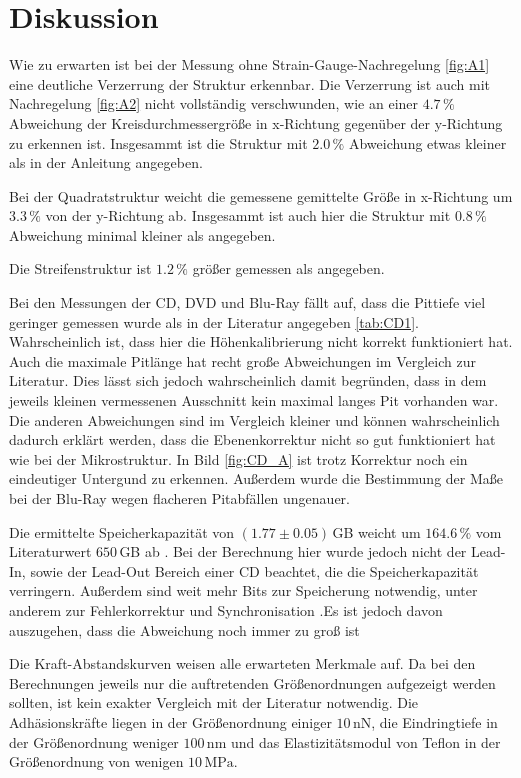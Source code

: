 \newpage
\section{Diskussion}
\label{sec:conclusion}

Wie zu erwarten ist bei der Messung ohne Strain-Gauge-Nachregelung \ref{fig:A1}
eine deutliche Verzerrung der Struktur erkennbar.
Die Verzerrung ist auch mit Nachregelung \ref{fig:A2} nicht vollständig verschwunden,
wie an einer $4.7\,\si{\percent}$ Abweichung der Kreisdurchmessergröße in x-Richtung gegenüber der y-Richtung zu erkennen ist.
Insgesammt ist die Struktur mit $2.0\,\si{\percent}$ Abweichung etwas kleiner als in der Anleitung angegeben.

Bei der Quadratstruktur weicht die gemessene gemittelte Größe in x-Richtung um $3.3\,\si{\percent}$ von der y-Richtung ab.
Insgesammt ist auch hier die Struktur mit $0.8\,\si{\percent}$ Abweichung minimal kleiner als angegeben.

Die Streifenstruktur ist $1.2\,\si{\percent}$ größer gemessen als angegeben.


Bei den Messungen der CD, DVD und Blu-Ray fällt auf, dass die Pittiefe viel geringer gemessen wurde 
als in der Literatur angegeben \ref{tab:CD1}. Wahrscheinlich ist, dass hier die Höhenkalibrierung nicht korrekt funktioniert hat.
Auch die maximale Pitlänge hat recht große Abweichungen im Vergleich zur Literatur. Dies lässt sich jedoch wahrscheinlich damit begründen,
dass in dem jeweils kleinen vermessenen Ausschnitt kein maximal langes Pit vorhanden war.
Die anderen Abweichungen sind im Vergleich kleiner und können wahrscheinlich dadurch erklärt werden, dass die Ebenenkorrektur nicht so gut funktioniert hat wie bei der Mikrostruktur.
In Bild \ref{fig:CD_A} ist trotz Korrektur noch ein eindeutiger Untergund zu erkennen. Außerdem wurde die Bestimmung der Maße bei der
Blu-Ray wegen flacheren Pitabfällen ungenauer.

Die ermittelte Speicherkapazität von $(1.77\pm0.05)\,$GB weicht um $164.6\,\si{\percent}$ vom Literaturwert $650\,$GB ab \cite{CD}.
Bei der Berechnung hier wurde jedoch nicht der Lead-In, sowie der Lead-Out Bereich einer CD
beachtet, die die Speicherkapazität verringern. Außerdem sind weit mehr Bits zur Speicherung notwendig, unter
anderem zur Fehlerkorrektur und Synchronisation \cite{CD2}.Es ist jedoch davon auszugehen, dass 
die Abweichung noch immer zu groß ist 



Die Kraft-Abstandskurven weisen alle erwarteten Merkmale auf.
Da bei den Berechnungen jeweils nur die auftretenden Größenordnungen aufgezeigt werden sollten, 
ist kein exakter Vergleich mit der Literatur notwendig.
Die Adhäsionskräfte liegen in der Größenordnung einiger $10\,\si{\nano\newton}$, die Eindringtiefe in der Größenordnung weniger $100\,\si{\nano\meter}$ und das Elastizitätsmodul von Teflon in der Größenordnung von wenigen $10\,\si{\mega\pascal}$.